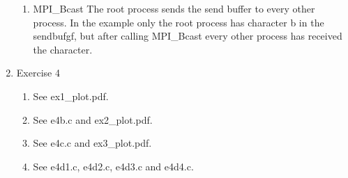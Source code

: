 \documentclass[12pt]{scrartcl}
\begin{document}
\begin{enumerate}
\begin{enumerate}
            \item{MPI\_Bcast} The root process sends the send buffer to every other process. In the example only the root process has character b in the sendbufgf, but after calling MPI\_Bcast every other process has received the character.
        \end{enumerate}
    \item{Exercise 4}
        \begin{enumerate}
            \item See ex1\_plot.pdf.
            \item See e4b.c and ex2\_plot.pdf.
            \item See e4c.c and ex3\_plot.pdf.
            \item See e4d1.c, e4d2.c, e4d3.c and e4d4.c.
        \end{enumerate}
\end{enumerate}


%
\end{document}
